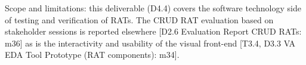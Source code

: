 

Scope and limitations: this deliverable (D4.4) covers the software
technology side of testing and verification of RATs.
%
The CRUD RAT evaluation based on stakeholder sessions is reported
elsewhere [D2.6 Evaluation Report CRUD RATs: m36] as is the
interactivity and usability of the visual front-end [T3.4, D3.3 VA EDA
  Tool Prototype (RAT components): m34].


